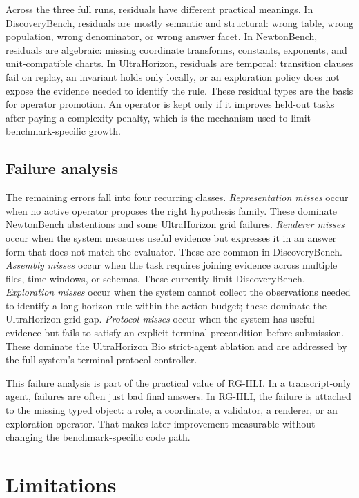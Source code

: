 \documentclass[letterpaper]{article}
\newcommand{\methodshort}{\textsc{RG-HLI}\xspace}
\begin{document}
Across the three full runs, residuals have different practical meanings. In
DiscoveryBench, residuals are mostly semantic and structural: wrong table,
wrong population, wrong denominator, or wrong answer facet. In NewtonBench,
residuals are algebraic: missing coordinate transforms, constants, exponents,
and unit-compatible charts. In UltraHorizon, residuals are temporal:
transition clauses fail on replay, an invariant holds only locally, or an
exploration policy does not expose the evidence needed to identify the rule.
These residual types are the basis for operator promotion. An operator is kept
only if it improves held-out tasks after paying a complexity penalty, which is
the mechanism used to limit benchmark-specific growth.

\subsection{Failure analysis}

The remaining errors fall into four recurring classes. \emph{Representation
misses} occur when no active operator proposes the right hypothesis family.
These dominate NewtonBench abstentions and some UltraHorizon grid failures.
\emph{Renderer misses} occur when the system measures useful evidence but
expresses it in an answer form that does not match the evaluator. These are
common in DiscoveryBench. \emph{Assembly misses} occur when the task requires
joining evidence across multiple files, time windows, or schemas. These
currently limit DiscoveryBench.
\emph{Exploration misses} occur when the system cannot collect the observations
needed to identify a long-horizon rule within the action budget; these dominate
the UltraHorizon grid gap. \emph{Protocol misses} occur when the system has
useful evidence but fails to satisfy an explicit terminal precondition before
submission. These dominate the UltraHorizon Bio strict-agent ablation and are
addressed by the full system's terminal protocol controller.

This failure analysis is part of the practical value of \methodshort. In a
transcript-only agent, failures are often just bad final answers. In \methodshort, the
failure is attached to the missing typed object: a role, a coordinate, a
validator, a renderer, or an exploration operator. That makes later improvement
measurable without changing the benchmark-specific code path.

\FloatBarrier

\section{Limitations}
\end{document}
